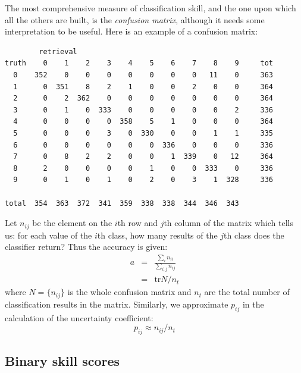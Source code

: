 \documentclass{article}
\begin{document}
The most comprehensive measure of classification skill, and the one upon
which all the others are built, is the {\it confusion matrix}, although
it needs some interpretation to be useful.
Here is an example of a confusion matrix:
\begin{verbatim}
        retrieval
truth    0    1    2    3    4    5    6    7    8    9     tot
  0    352    0    0    0    0    0    0    0   11    0     363
  1      0  351    8    2    1    0    0    2    0    0     364
  2      0    2  362    0    0    0    0    0    0    0     364
  3      0    1    0  333    0    0    0    0    0    2     336
  4      0    0    0    0  358    5    1    0    0    0     364
  5      0    0    0    3    0  330    0    0    1    1     335
  6      0    0    0    0    0    0  336    0    0    0     336
  7      0    8    2    2    0    0    1  339    0   12     364
  8      2    0    0    0    0    1    0    0  333    0     336
  9      0    1    0    1    0    2    0    3    1  328     336

total  354  363  372  341  359  338  338  344  346  343
\end{verbatim}
Let $n_{ij}$ be the element on the $i$th row and $j$th column of the matrix
which tells us: for each value of the $i$th class, how many results of the
$j$th class does the classifier return?
Thus the accuracy is given:
\begin{eqnarray}
	a&=&\frac{\sum_i n_{ii}}{\sum_{i,j} n_{ij}}\\
	 &=&\mathrm{tr}{N}/n_t
\end{eqnarray}
where $N=\lbrace n_{ij} \rbrace$ is the whole confusion matrix and
$n_t$ are the total number of classification results in the matrix.
Similarly, we approximate $p_{ij}$ in the calculation of the uncertainty
coefficient:
\begin{equation}
	p_{ij}\approx n_{ij}/n_t
\end{equation}

\subsection{Binary skill scores}
\end{document}
